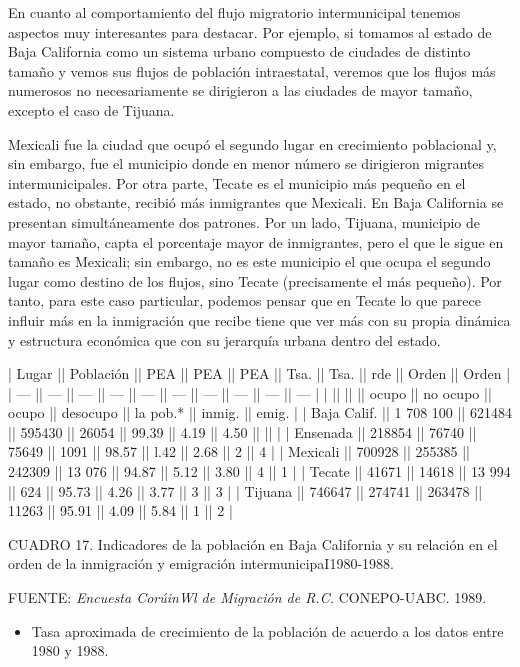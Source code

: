 \documentclass{article}
\begin{document}
En cuanto al comportamiento del flujo migratorio intermunicipal tenemos aspectos muy interesantes para destacar. Por ejemplo, si tomamos al estado de Baja California como un sistema urbano compuesto de ciudades de distinto tamaño y vemos sus flujos de población intraestatal, veremos que los flujos más numerosos no necesariamente se dirigieron a las ciudades de mayor tamaño, excepto el caso de Tijuana.

Mexicali fue la ciudad que ocupó el segundo lugar en crecimiento poblacional y, sin embargo, fue el municipio donde en menor número se dirigieron migrantes intermunicipales. Por otra parte, Tecate es el municipio más pequeño en el estado, no obstante, recibió más inmigrantes que Mexicali. En Baja California se presentan simultáneamente dos patrones. Por un lado, Tijuana, municipio de mayor tamaño, capta el porcentaje mayor de inmigrantes, pero el que le sigue en tamaño es Mexicali; sin embargo, no es este municipio el que ocupa el segundo lugar como destino de los flujos, sino Tecate (precisamente el más pequeño). Por tanto, para este caso particular, podemos pensar que en Tecate lo que parece influir más en la inmigración que recibe tiene que ver más con su propia dinámica y estructura económica que con su jerarquía urbana dentro del estado.

| Lugar       || Población || PEA    || PEA    || PEA      || Tsa.  || Tsa.     || rde      || Orden  || Orden |
| ---         || ---       || ---    || ---    || ---      || ---   || ---      || ---      || ---    || ---   |
|             ||           ||        || ocupo  || no ocupo || ocupo || desocupo || la pob.* || inmig. || emig. |
| Baja Calif. || 1 708 100 || 621484 || 595430 || 26054    || 99.39 || 4.19     || 4.50     ||        ||       |
| Ensenada    || 218854    || 76740  || 75649  || 1091     || 98.57 || l.42     || 2.68     || 2      || 4     |
| Mexicali    || 700928    || 255385 || 242309 || 13 076   || 94.87 || 5.12     || 3.80     || 4      || 1     |
| Tecate      || 41671     || 14618  || 13 994 || 624      || 95.73 || 4.26     || 3.77     || 3      || 3     |
| Tijuana     || 746647    || 274741 || 263478 || 11263    || 95.91 || 4.09     || 5.84     || 1      || 2     |

CUADRO 17. Indicadores de la población en Baja California y su relación en el orden de la inmigración y emigración intermunicipaI1980-1988.

FUENTE: \textit{Encuesta CorúinWl de Migración de R.C.} CONEPO-UABC. 1989.
\begin{itemize}
\item 
Tasa aproximada de crecimiento de la población de acuerdo a los datos entre 1980 y 1988.

\end{itemize}
\end{document}

